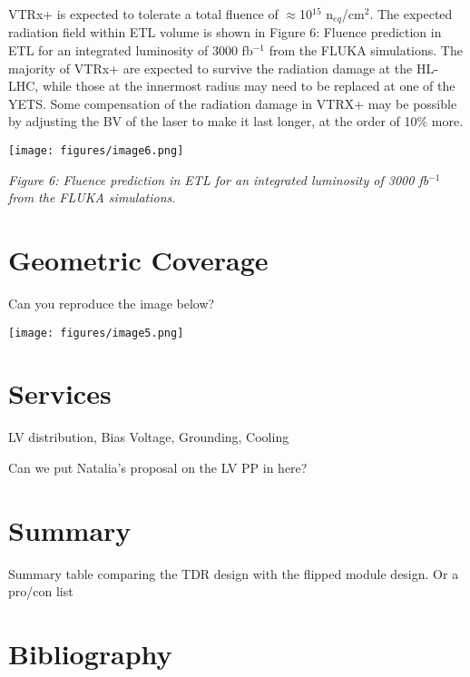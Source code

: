 \documentclass[11pt]{article}
\begin{document}
VTRx+ is expected to tolerate a total fluence of $\approx$10$^{15}$ n$_{eq}$/cm$^{2}$. The expected radiation field within ETL volume is shown in Figure 6: Fluence prediction in ETL for an integrated luminosity of 3000 fb$^{-1}$ from the FLUKA simulations. The majority of VTRx+ are expected to survive the radiation damage at the HL-LHC, while those at the innermost radius may need to be replaced at one of the YETS. Some compensation of the radiation damage in VTRX+ may be possible by adjusting the BV of the laser to make it last longer, at the order of 10\% more.

\texttt{[image: figures/image6.png]}

\emph{Figure 6: Fluence prediction in ETL for an integrated luminosity of 3000 fb$^{-1}$ from the FLUKA simulations.}

\section{Geometric Coverage}

Can you reproduce the image below?

\texttt{[image: figures/image5.png]}

\section{Services}

LV distribution, Bias Voltage, Grounding, Cooling

Can we put Natalia's proposal on the LV PP in here?

\section{Summary}

Summary table comparing the TDR design with the flipped module design. Or a pro/con list

\section{Bibliography}
\end{document}
